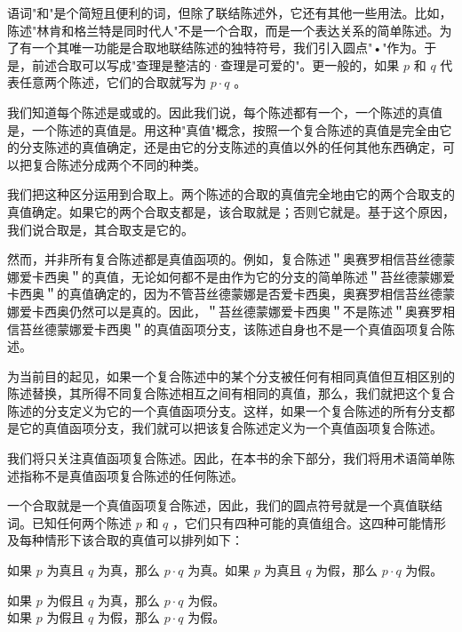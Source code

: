 语词"和"是个简短且便利的词，但除了联结陈述外，它还有其他一些用法。比如，陈述"林肯和格兰特是同时代人"不是一个合取，而是一个表达关系的简单陈述。为了有一个其唯一功能是合取地联结陈述的独特符号，我们引入圆点"•"作为。于是，前述合取可以写成"查理是整洁的·查理是可爱的"。更一般的，如果 $p$ 和 $q$ 代表任意两个陈述，它们的合取就写为 $p \cdot q$ 。

我们知道每个陈述是或或的。因此我们说，每个陈述都有一个，一个陈述的真值是，一个陈述的真值是。用这种"真值"概念，按照一个复合陈述的真值是完全由它的分支陈述的真值确定，还是由它的分支陈述的真值以外的任何其他东西确定，可以把复合陈述分成两个不同的种类。

\begin{theorembox}[title=真值函项复合陈述]
我们把这种区分运用到合取上。两个陈述的合取的真值完全地由它的两个合取支的真值确定。如果它的两个合取支都是，该合取就是；否则它就是。基于这个原因，我们说合取是，其合取支是它的。
\end{theorembox}

然而，并非所有复合陈述都是真值函项的。例如，复合陈述＂奥赛罗相信苔丝德蒙娜爱卡西奥＂的真值，无论如何都不是由作为它的分支的简单陈述＂苔丝德蒙娜爱卡西奥＂的真值确定的，因为不管苔丝德蒙娜是否爱卡西奥，奥赛罗相信苔丝德蒙娜爱卡西奥仍然可以是真的。因此，＂苔丝德蒙娜爱卡西奧＂不是陈述＂奥赛罗相信苔丝德蒙娜爱卡西奧＂的真值函项分支，该陈述自身也不是一个真值函项复合陈述。

为当前目的起见，如果一个复合陈述中的某个分支被任何有相同真值但互相区别的陈述替换，其所得不同复合陈述相互之间有相同的真值，那么，我们就把这个复合陈述的分支定义为它的一个真值函项分支。这样，如果一个复合陈述的所有分支都是它的真值函项分支，我们就可以把该复合陈述定义为一个真值函项复合陈述。\cite{church1956}

我们将只关注真值函项复合陈述。因此，在本书的余下部分，我们将用术语简单陈述指称不是真值函项复合陈述的任何陈述。

一个合取就是一个真值函项复合陈述，因此，我们的圆点符号就是一个真值联结词。已知任何两个陈述 $p$ 和 $q$ ，它们只有四种可能的真值组合。这四种可能情形及每种情形下该合取的真值可以排列如下：

如果 $p$ 为真且 $q$ 为真，那么 $p \cdot q$ 为真。如果 $p$ 为真且 $q$ 为假，那么 $p \cdot q$ 为假。

如果 $p$ 为假且 $q$ 为真，那么 $p \cdot q$ 为假。\\
如果 $p$ 为假且 $q$ 为假，那么 $p \cdot q$ 为假。

